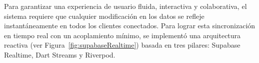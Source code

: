 Para garantizar una experiencia de usuario fluida, interactiva y colaborativa, el sistema requiere que cualquier modificación en los datos se refleje instantáneamente en todos los clientes conectados. Para lograr esta sincronización en tiempo real con un acoplamiento mínimo, se implementó una arquitectura reactiva (ver Figura~\ref{fig:supabaseRealtime}) basada en tres pilares: Supabase Realtime, Dart Streams y Riverpod.

